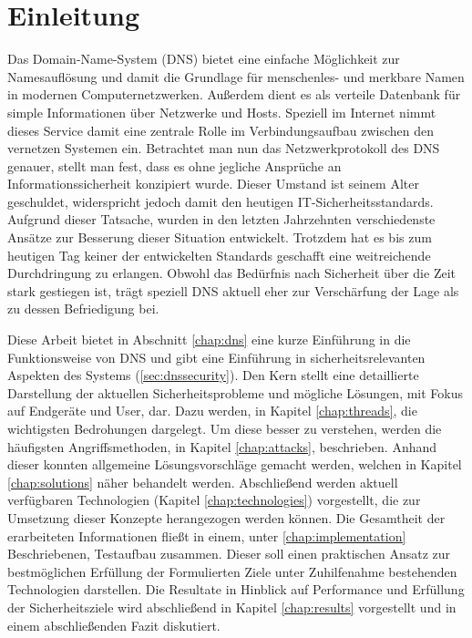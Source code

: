 \chapter{Einleitung}
Das Domain-Name-System (DNS) bietet eine einfache Möglichkeit zur Namesauflösung und damit die Grundlage für menschenles- und merkbare Namen in modernen Computernetzwerken. Außerdem dient es als verteile Datenbank für simple Informationen über Netzwerke und Hosts. Speziell im Internet nimmt dieses Service damit eine zentrale Rolle im Verbindungsaufbau zwischen den vernetzen Systemen ein. Betrachtet man nun das Netzwerkprotokoll des DNS genauer, stellt man fest, dass es ohne jegliche Ansprüche an Informationssicherheit konzipiert wurde. Dieser Umstand ist seinem Alter geschuldet, widerspricht jedoch damit den heutigen IT-Sicherheitsstandards. Aufgrund dieser Tatsache, wurden in den letzten Jahrzehnten verschiedenste Ansätze zur Besserung dieser Situation entwickelt. Trotzdem hat es bis zum heutigen Tag keiner der entwickelten Standards geschafft eine weitreichende Durchdringung zu erlangen. Obwohl das Bedürfnis nach Sicherheit über die Zeit stark gestiegen ist, trägt speziell DNS aktuell eher zur Verschärfung der Lage als zu dessen Befriedigung bei.

Diese Arbeit bietet in Abschnitt \ref{chap:dns} eine kurze Einführung in die Funktionsweise von DNS und gibt eine Einführung in sicherheitsrelevanten Aspekten des Systems (\ref{sec:dnssecurity}). Den Kern stellt eine detaillierte Darstellung der aktuellen Sicherheitsprobleme und mögliche Lösungen, mit Fokus auf Endgeräte und User, dar. Dazu werden, in Kapitel \ref{chap:threads}, die wichtigsten Bedrohungen dargelegt. Um diese besser zu verstehen, werden die häufigsten Angriffsmethoden, in Kapitel \ref{chap:attacks}, beschrieben. Anhand dieser konnten allgemeine Lösungsvorschläge gemacht werden, welchen in Kapitel \ref{chap:solutions} näher behandelt werden. Abschließend werden aktuell verfügbaren Technologien (Kapitel \ref{chap:technologies}) vorgestellt, die zur Umsetzung dieser Konzepte herangezogen werden können. Die Gesamtheit der erarbeiteten Informationen fließt in einem, unter \ref{chap:implementation} Beschriebenen, Testaufbau zusammen. Dieser soll einen praktischen Ansatz zur bestmöglichen Erfüllung der Formulierten Ziele unter Zuhilfenahme bestehenden Technologien darstellen. Die Resultate in Hinblick auf Performance und Erfüllung der Sicherheitsziele wird abschließend in Kapitel \ref{chap:results} vorgestellt und in einem abschließenden Fazit diskutiert.
